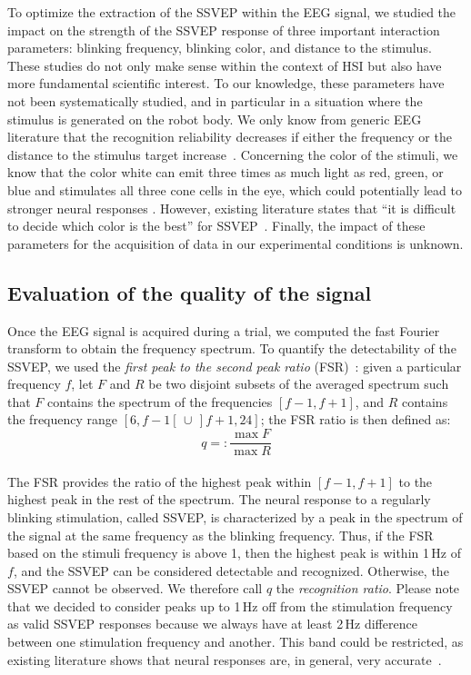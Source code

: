 \documentclass[smallextended]{svjour3}
\begin{document}
To optimize the extraction of the SSVEP within the EEG signal, we studied the impact on the strength of the SSVEP response of three important interaction parameters: blinking frequency, blinking color, and distance to the stimulus. 
These studies do not only make sense within the context of HSI but also have more fundamental scientific interest. 
To our knowledge, these parameters have not been systematically studied, and in particular in a situation where the stimulus is generated on the robot body. We only know from generic EEG literature that the recognition reliability decreases if either the frequency or the distance to the stimulus target increase~\cite{herrmann2001,wu2013effect}. 
Concerning the color of the stimuli, we know that the color white can emit three times as much light as red, green, or blue and stimulates all three cone cells in the eye, which could potentially lead to stronger neural responses \cite{aljshamee2016discriminate,cao2012flashing}. 
However, existing literature states that ``it is difficult to decide which color is the best'' for SSVEP~\cite{Zhu2010}.
Finally, the impact of these parameters for the acquisition of data in our experimental conditions is unknown. 
\\
\subsection{Evaluation of the quality of the signal}

Once the EEG signal is acquired during a trial, we computed the fast Fourier transform to obtain the frequency spectrum. 
To quantify the detectability of the SSVEP, we used the \textit{first peak to the second peak ratio} (FSR)~\cite{Zheng2010}:
given a particular frequency $f$, let $F$ and $R$ be two disjoint subsets of the averaged spectrum such that $F$ contains the spectrum of the frequencies $[f-1, f+1]$, and $R$ contains the frequency range $[6, f-1[ \,\cup\, ]f+1, 24]$; the FSR ratio is then defined as:
\begin{equation}
\label{recog_rat}
q =:\frac{\max F}{\max R}
\end{equation}
\\
The FSR provides the ratio of the highest peak within $[f-1, f+1]$ to the highest peak in the rest of the spectrum. 
The neural response to a regularly blinking stimulation, called SSVEP, is characterized by a peak in the spectrum of the signal at the same frequency as the blinking frequency. 
Thus, if the FSR based on the stimuli frequency is above 1, then the highest peak is within 1\,Hz of $f$, and the SSVEP can be considered detectable and recognized. 
Otherwise, the SSVEP cannot be observed. 
We therefore call $q$ the \textit{recognition ratio}.
Please note that we decided to consider peaks up to 1\,Hz off from the stimulation frequency as valid SSVEP responses because we always have at least 2\,Hz difference between one stimulation frequency and another. 
This band could be restricted, as existing literature shows that neural responses are, in general, very accurate~\cite{SSVEPfiability}.
\end{document}
